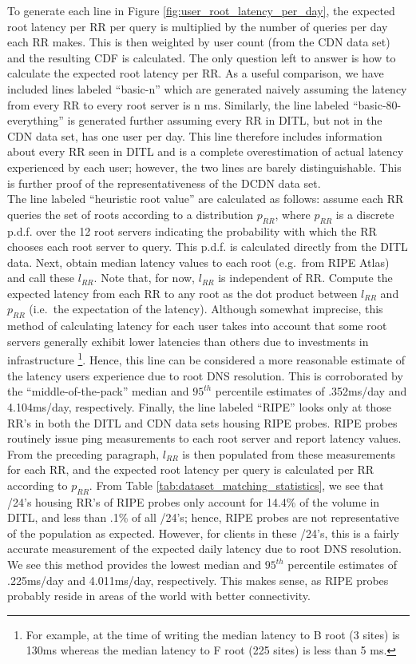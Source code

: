 \documentclass[sigconf,nonacm,10pt]{acmart}
\begin{document}
To generate each line in Figure \ref{fig:user_root_latency_per_day}, the
expected root latency per RR per query is multiplied by the number of
queries per day each RR makes. This is then weighted by user count (from
the CDN data set) and the resulting CDF is calculated. The only question
left to answer is how to calculate the expected root latency per RR. As
a useful comparison, we have included lines labeled ``basic-n'' which
are generated naively assuming the latency from every RR to every root
server is n ms. Similarly, the line labeled ``basic-80-everything'' is
generated further assuming every RR in DITL, but not in the CDN data
set, has one user per day. This line therefore includes information
about every RR seen in DITL and is a complete overestimation of actual
latency experienced by each user; however, the two lines are barely
distinguishable. This is further proof of the representativeness of the
DCDN data set.\\
The line labeled ``heuristic root value'' are calculated as follows:
assume each RR queries the set of roots according to a distribution
\(p_{RR}\), where \(p_{RR}\) is a discrete p.d.f. over the 12 root
servers indicating the probability with which the RR chooses each root
server to query. This p.d.f. is calculated directly from the DITL data.
Next, obtain median latency values to each root (e.g.~from RIPE Atlas)
and call these \(l_{RR}\). Note that, for now, \(l_{RR}\) is independent
of RR. Compute the expected latency from each RR to any root as the dot
product between \(l_{RR}\) and \(p_{RR}\) (i.e.~the expectation of the
latency). Although somewhat imprecise, this method of calculating
latency for each user takes into account that some root servers
generally exhibit lower latencies than others due to investments in
infrastructure
\footnote{ For example, at the time of writing the median latency to B root (3 sites) is 130ms whereas the median latency to F root  (225 sites) is less than 5 ms. }.
Hence, this line can be considered a more reasonable estimate of the
latency users experience due to root DNS resolution. This is
corroborated by the ``middle-of-the-pack'' median and \(95^{th}\)
percentile estimates of .352ms/day and 4.104ms/day, respectively.
Finally, the line labeled ``RIPE'' looks only at those RR's in both the
DITL and CDN data sets housing RIPE probes. RIPE probes routinely issue
ping measurements to each root server and report latency values. From
the preceding paragraph, \(l_{RR}\) is then populated from these
measurements for each RR, and the expected root latency per query is
calculated per RR according to \(p_{RR}\). From Table
\ref{tab:dataset_matching_statistics}, we see that /24's housing RR's of
RIPE probes only account for 14.4\% of the volume in DITL, and less than
.1\% of all /24's; hence, RIPE probes are not representative of the
population as expected. However, for clients in these /24's, this is a
fairly accurate measurement of the expected daily latency due to root
DNS resolution. We see this method provides the lowest median and
\(95^{th}\) percentile estimates of .225ms/day and 4.011ms/day,
respectively. This makes sense, as RIPE probes probably reside in areas
of the world with better connectivity.
\end{document}
